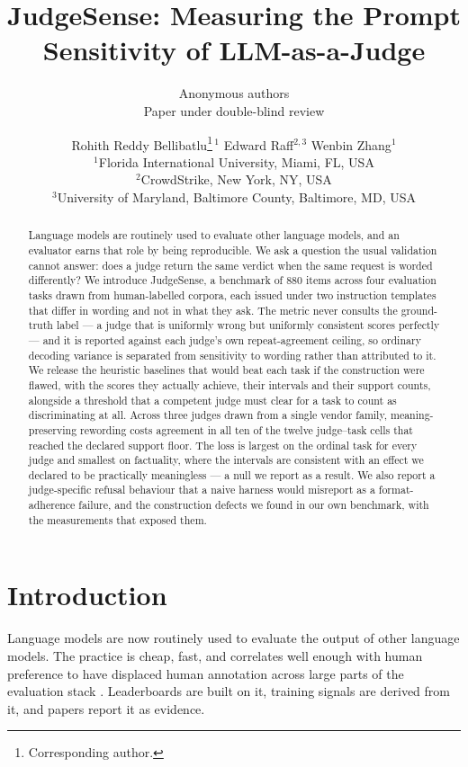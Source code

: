 \documentclass[11pt]{article}          %
\title{JudgeSense: Measuring the Prompt Sensitivity of LLM-as-a-Judge}
\author{Anonymous authors\\Paper under double-blind review}
\author{
    Rohith Reddy Bellibatlu\thanks{Corresponding author.}\,$^{1}$ \quad
    Edward Raff$^{2,3}$ \quad
    Wenbin Zhang$^{1}$ \\[0.6em]
    {\normalsize $^{1}$Florida International University, Miami, FL, USA} \\
    {\normalsize $^{2}$CrowdStrike, New York, NY, USA} \\
    {\normalsize $^{3}$University of Maryland, Baltimore County, Baltimore, MD, USA}
  }
\date{}
\begin{document}
\maketitle

\begin{abstract}
Language models are routinely used to evaluate other language models, and an
evaluator earns that role by being reproducible. We ask a question the usual
validation cannot answer: does a judge return the same verdict when the same
request is worded differently? We introduce JudgeSense, a benchmark of 880 items
across four evaluation tasks drawn from human-labelled corpora, each issued under
two instruction templates that differ in wording and not in what they ask. The
metric never consults the ground-truth label --- a judge that is uniformly wrong
but uniformly consistent scores perfectly --- and it is reported against each
judge's own repeat-agreement ceiling, so ordinary decoding variance is separated
from sensitivity to wording rather than attributed to it. We release the
heuristic baselines that would beat each task if the construction were flawed,
with the scores they actually achieve, their intervals and their support counts,
alongside a threshold that a competent judge must clear for a task to count as
discriminating at all. Across three judges drawn from a single vendor family,
meaning-preserving rewording costs agreement in all ten of the twelve
judge--task cells that reached the declared support floor. The loss is largest on
the ordinal task for every judge and smallest on factuality, where the intervals
are consistent with an effect we declared to be practically meaningless --- a
null we report as a result. We also report a judge-specific
refusal behaviour that a naive harness would misreport as a format-adherence
failure, and the construction defects we found in our own benchmark, with the
measurements that exposed them.
\end{abstract}

\section{Introduction}
\label{sec:intro}

Language models are now routinely used to evaluate the output of other language
models. The practice is cheap, fast, and correlates well enough with human
preference to have displaced human annotation across large parts of the
evaluation stack \citep{zheng2023judging}. Leaderboards are built on it, training
signals are derived from it, and papers report it as evidence.
\end{document}
